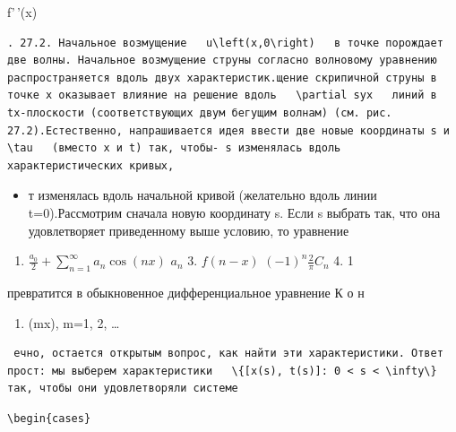 \documentclass[
  ukrainian,
]{article}
\providecommand{\tightlist}{%
  \setlength{\itemsep}{0pt}\setlength{\parskip}{0pt}}
\begin{document}
f'\,'(x)

\begin{verbatim}
. 27.2. Начальное возмущение   u\left(x,0\right)   в точке порождает две волны. Начальное возмущение струны согласно волновому уравнению распространяется вдоль двух характеристик.щение скрипичной струны в точке x оказывает влияние на решение вдоль   \partial syx   линий в tx-плоскости (соответствующих двум бегущим волнам) (см. рис. 27.2).Естественно, напрашивается идея ввести две новые координаты s и   \tau   (вместо x и t) так, чтобы- s изменялась вдоль характеристических кривых,
\end{verbatim}

\begin{itemize}
\tightlist
\item
  т изменялась вдоль начальной кривой (желательно вдоль линии
  t=0).Рассмотрим сначала новую координату s. Если s выбрать так, что
  она удовлетворяет приведенному выше условию, то уравнение
\end{itemize}

\begin{enumerate}
\def\labelenumi{\arabic{enumi}.}
\setcounter{enumi}{1}
\tightlist
\item
  \(\frac{a_{0}}{2} + \sum_{n=1}^{\infty} a_{n} \cos(nx)\) \(a_{n}\) 3.
  \(f(n-x)\) \((-1)^{n} \frac{2}{\pi} C_{n}\) 4. 1
\end{enumerate}

превратится в обыкновенное дифференциальное уравнение К о н

\begin{enumerate}
\def\labelenumi{\arabic{enumi}.}
\setcounter{enumi}{4}
\tightlist
\item
  \cos(mx), m=1, 2, \dots 
\end{enumerate}

\begin{verbatim}
 ечно, остается открытым вопрос, как найти эти характеристики. Ответ прост: мы выберем характеристики   \{[x(s), t(s)]: 0 < s < \infty\}   так, чтобы они удовлетворяли системе
\end{verbatim}

\begin{verbatim}
\begin{cases}
\end{verbatim}
\end{document}
